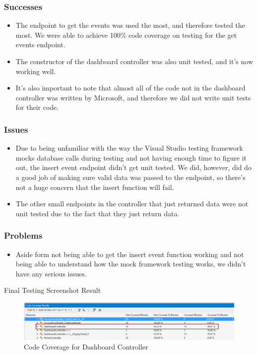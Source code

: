 \subsubsection{Successes}
\begin{itemize}
\item The endpoint to get the events was used the most, and therefore tested the most. We were able to achieve 100\% code coverage on testing for the get events endpoint.
\item The constructor of the dashboard controller was also unit tested, and it's now working well.
\item It's also important to note that almost all of the code not in the dashboard controller was written by Microsoft, and therefore we did not write unit tests for their code.
\end{itemize}
\subsubsection{Issues}
\begin{itemize}
\item Due to being unfamiliar with the way the Visual Studio testing framework mocks database calls during testing and not having enough time to figure it out, the insert event endpoint didn't get unit tested. We did, however, did do a good job of making sure valid data was passed to the endpoint, so there's not a huge concern that the insert function will fail.
\item The other small endpoints in the controller that just returned data were not unit tested due to the fact that they just return data.
\end{itemize}
\subsubsection{Problems}
\begin{itemize}
\item Aside form not being able to get the insert event function working and not being able to understand how the mock framework testing works, we didn't have any serious issues.
\end{itemize}

Final Testing Screenshot Result

\begin{figure}[tbh] \includegraphics[scale=0.45]{./webAppCodeCoverage.png}
  \caption{Code Coverage for Dashboard Controller}
 \label{fig:webappCodeCoverage}
\end{figure}

